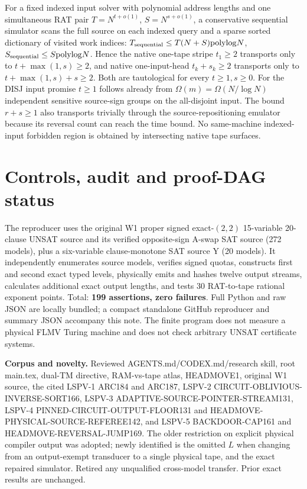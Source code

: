 \documentclass[11pt]{article}
\begin{document}
For a fixed indexed input solver with polynomial address lengths and one simultaneous RAT pair $T=N^{t+o(1)}$, $S=N^{s+o(1)}$, a conservative sequential simulator scans the full source on each indexed query and a sparse sorted dictionary of visited work indices: $T_{\rm sequential}\le T(N+S)\mathrm{polylog}N$, $S_{\rm sequential}\le S\mathrm{polylog}N$. Hence the native one-tape stripe $t_1\ge2$ transports only to $t+\max(1,s)\ge2$, and native one-input-head $t_k+s_k\ge2$ transports only to $t+\max(1,s)+s\ge2$. Both are tautological for every $t\ge1,s\ge0$. For the DISJ input promise $t\ge1$ follows already from $\Omega(m)=\Omega(N/\log N)$ independent sensitive source-sign groups on the all-disjoint input. The bound $r+s\ge1$ also transports trivially through the source-repositioning emulator because its reversal count can reach the time bound. No same-machine indexed-input forbidden region is obtained by intersecting native tape surfaces.

\section{Controls, audit and proof-DAG status}
The reproducer uses the original W1 proper signed exact-$(2,2)$ 15-variable 20-clause UNSAT source and its verified opposite-sign A-swap SAT source (272 models), plus a six-variable clause-monotone SAT source Y (20 models). It independently enumerates source models, verifies signed quotas, constructs first and second exact typed levels, physically emits and hashes twelve output streams, calculates additional exact output lengths, and tests 30 RAT-to-tape rational exponent points. Total: \textbf{199 assertions, zero failures}. Full Python and raw JSON are locally bundled; a compact standalone GitHub reproducer and summary JSON accompany this note. The finite program does not measure a physical FLMV Turing machine and does not check arbitrary UNSAT certificate systems.

\noindent\textbf{Corpus and novelty.} Reviewed AGENTS.md/CODEX.md/research skill, root main.tex, dual-TM directive, RAM-vs-tape atlas, HEADMOVE1, original W1 source, the cited LSPV-1 ARC184 and ARC187, LSPV-2 CIRCUIT-OBLIVIOUS-INVERSE-SORT166, LSPV-3 ADAPTIVE-SOURCE-POINTER-STREAM131, LSPV-4 PINNED-CIRCUIT-OUTPUT-FLOOR131 and HEADMOVE-PHYSICAL-SOURCE-REFEREE142, and LSPV-5 BACKDOOR-CAP161 and HEADMOVE-REVERSAL-JUMP169. The older restriction on explicit physical compiler output was adopted; newly identified is the omitted $L$ when changing from an output-exempt transducer to a single physical tape, and the exact repaired simulator. Retired any unqualified cross-model transfer. Prior exact results are unchanged.
\end{document}
